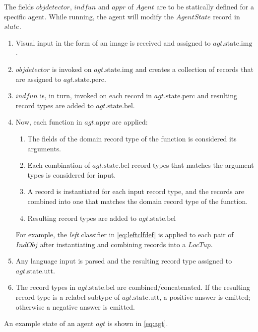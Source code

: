 The fields $objdetector$, $indfun$ and $appr$ of $Agent$ are to be statically defined for a specific agent.
While running, the agent will modify the $AgentState$ record in $state$.

\begin{enumerate}
\item Visual input in the form of an image is received and assigned to $agt.\text{state}.\text{img}$.
\item $objdetector$ is invoked on $agt.\text{state.img}$ and creates a collection of records that are assigned to $agt.\text{state}.\text{perc}$.
\item $indfun$ is, in turn, invoked on each record in $agt.\text{state.perc}$ and resulting record types are added to $agt.\text{state.bel}$.
\item Now, each function in $agt.\text{appr}$ are applied:
	\begin{enumerate}
	\item The fields of the domain record type of the function is considered its arguments.
	\item Each combination of $agt.\text{state.bel}$ record types that matches the argument types is considered for input.
	\item A record is instantiated for each input record type, and the records are combined into one that matches the domain record type of the function.
	\item Resulting record types are added to $agt.\text{state.bel}$
	\end{enumerate}
	For example, the \textit{left} classifier in \autoref{eq:leftclfdef} is applied to each pair of $IndObj$ after instantiating and combining records into a $LocTup$.
\item Any language input is parsed and the resulting record type assigned to $agt.\text{state.utt}$.
\item The record types in $agt.\text{state.bel}$ are combined/concatenated. If the resulting record type is a relabel-subtype of $agt.\text{state.utt}$, a positive answer is emitted; otherwise a negative answer is emitted.
\end{enumerate}

An example state of an agent $agt$ is shown in \autoref{eq:agt}.

